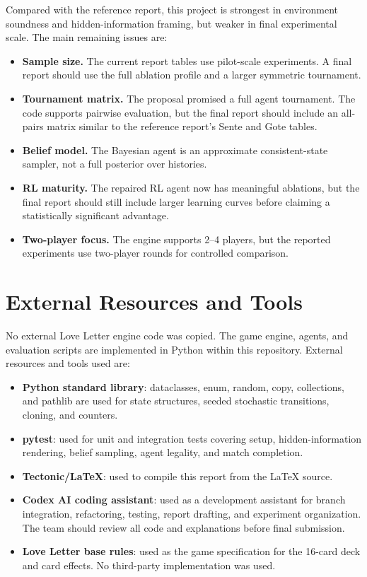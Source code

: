 \documentclass[10pt,twocolumn]{article}
\begin{document}
Compared with the reference report, this project is strongest in environment
soundness and hidden-information framing, but weaker in final experimental
scale. The main remaining issues are:
\begin{itemize}
    \item \textbf{Sample size.} The current report tables use pilot-scale
    experiments. A final report should use the full ablation profile and a
    larger symmetric tournament.
    \item \textbf{Tournament matrix.} The proposal promised a full agent
    tournament. The code supports pairwise evaluation, but the final report
    should include an all-pairs matrix similar to the reference report's Sente
    and Gote tables.
    \item \textbf{Belief model.} The Bayesian agent is an approximate
    consistent-state sampler, not a full posterior over histories.
    \item \textbf{RL maturity.} The repaired RL agent now has meaningful
    ablations, but the final report should still include larger learning
    curves before claiming a statistically significant advantage.
    \item \textbf{Two-player focus.} The engine supports 2--4 players, but the
    reported experiments use two-player rounds for controlled comparison.
\end{itemize}

\section{External Resources and Tools}

No external Love Letter engine code was copied. The game engine, agents, and
evaluation scripts are implemented in Python within this repository. External
resources and tools used are:
\begin{itemize}
    \item \textbf{Python standard library}: dataclasses, enum, random, copy,
    collections, and pathlib are used for state structures, seeded stochastic
    transitions, cloning, and counters.
    \item \textbf{pytest}: used for unit and integration tests covering setup,
    hidden-information rendering, belief sampling, agent legality, and match
    completion.
    \item \textbf{Tectonic/LaTeX}: used to compile this report from the LaTeX
    source.
    \item \textbf{Codex AI coding assistant}: used as a development assistant
    for branch integration, refactoring, testing, report drafting, and
    experiment organization. The team should review all code and explanations
    before final submission.
    \item \textbf{Love Letter base rules}: used as the game specification for
    the 16-card deck and card effects. No third-party implementation was used.
\end{itemize}
\end{document}
